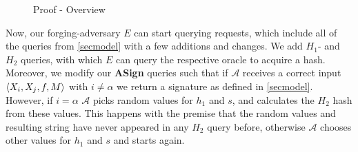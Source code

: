 \begin{figure}[htbp]

  \begin{center}
  \end{center}

  \caption{Proof - Overview}
  \label{fig:proofoverview}
\end{figure}

Now, our forging-adversary \(E\) can start querying requests, which include all of the queries from \autoref{secmodel} with a few additions and changes.
We add \(H_1\)- and \(H_2\) queries, with which \(E\) can query the respective oracle to acquire a hash. 
Moreover, we modify our \textbf{ASign} queries such that if \(\mathcal{A}\) receives a correct input \(\langle X_i, X_j, f, M \rangle\) with \(i\neq\alpha\) we return a signature as defined in \autoref{secmodel}.
However, if \(i = \alpha\) \(\mathcal{A}\) picks random values for \(h_1\) and \(s\), and calculates the \(H_2\) hash from these values.
This happens with the premise that the random values and resulting string have never appeared in any \(H_2\) query before, otherwise \(\mathcal{A}\) chooses other values for \(h_1\) and \(s\) and starts again.

